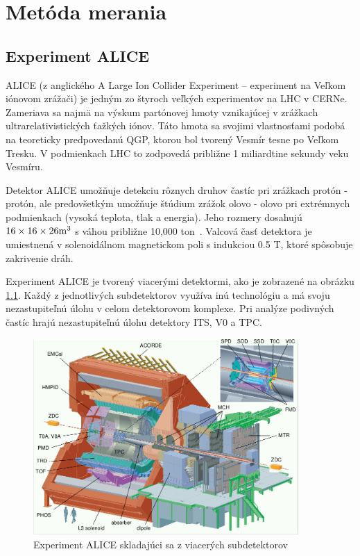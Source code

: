 \documentclass[thesismargins, thesislinespacing]{rnthesis}
\begin{document}
\chapter{Metóda merania}

\section{Experiment ALICE}

ALICE (z anglického A Large Ion Collider Experiment – experiment na Veľkom iónovom zrážači) je jedným zo štyroch veľkých experimentov na LHC v CERNe. Zameriava sa najmä na výskum partónovej hmoty vznikajúcej v zrážkach ultrarelativistických ťažkých iónov. Táto hmota sa svojimi vlastnosťami podobá na teoreticky predpovedanú QGP, ktorou bol tvorený Vesmír tesne po Veľkom Tresku. V podmienkach LHC to zodpovedá približne 1 miliardtine sekundy veku Vesmíru.

Detektor  ALICE umožňuje detekciu rôznych druhov častíc pri zrážkach protón - protón, ale predovšetkým umožňuje štúdium zrážok olovo - olovo pri extrémnych podmienkach (vysoká teplota, tlak a energia). Jeho rozmery dosahujú $16\times 16\times26 \rm{m^3}$ s váhou približne 10,000 ton~\cite{alice}. Valcová časť detektora je umiestnená v solenoidálnom magnetickom poli s indukciou 0.5 T, ktoré spôsobuje zakrivenie dráh.

Experiment ALICE je tvorený viacerými detektormi, ako je zobrazené na obrázku \ref{ALICE}. Každý z jednotlivých subdetektorov využíva inú technológiu a má svoju nezastupiteľnú úlohu v celom detektorovom komplexe. Pri analýze podivných častíc hrajú nezastupiteľnú úlohu detektory ITS, V0 a TPC.

\begin{figure}[hbtp!]
	\begin{center}
		\includegraphics[width=0.9\textwidth]{./Obrazky_praca/ALICE.png}
		\caption{Experiment ALICE skladajúci sa z viacerých subdetektorov~\cite{aliceDetektor}}
		\label{ALICE}
	\end{center}
\end{figure}
\end{document}
